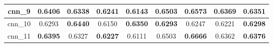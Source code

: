 \begin{table}[hp]
\begin{tabular} {|c|c|c|c|c|c|c|c|c| }
        cnn\_9   & \textbf{0.6406}                     & 0.6338                              & \textbf{0.6241}                     & 0.6143                              & 0.6503                              & \textbf{0.6573}                     & \textbf{0.6369}                     & 0.6351                              \\ \hline
        cnn\_10  & 0.6293                              & \textbf{0.6440}                     & 0.6150                              & \textbf{0.6350}                     & \textbf{0.6293}                     & 0.6247                              & 0.6221                              & \textbf{0.6298}                     \\ \hline
        cnn\_11  & \textbf{0.6395}                     & 0.6327                              & \textbf{0.6227}                     & 0.6111                              & 0.6503                              & \textbf{0.6666}                     & 0.6362                              & \textbf{0.6376}                     \\ \hline
    \end{tabular}
\end{table}



